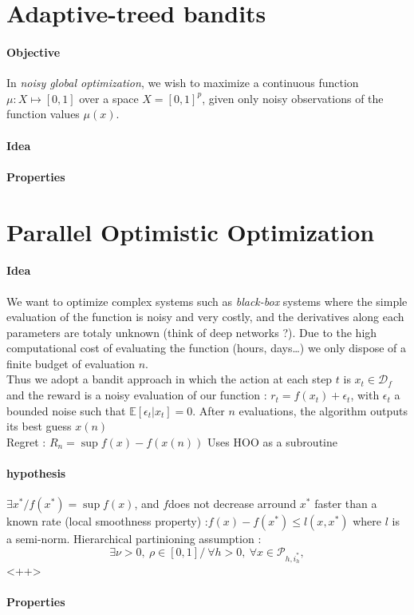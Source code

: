 \documentclass[a4paper,11pt,titlepage]{article}
\begin{document}
\section{Adaptive-treed bandits}
\paragraph{Objective}
In \textit{noisy global optimization}, we wish to maximize a continuous function $\mu :X \mapsto [0, 1]$ over a space $X = [0, 1]^p$, given only noisy observations of the function values $\mu(x)$.
\paragraph{Idea}
\paragraph{Properties}


\section{Parallel Optimistic Optimization}
\paragraph{Idea}
We want to optimize complex systems such as \textit{black-box} systems where the simple evaluation of the function is noisy and very costly, and the derivatives along each parameters are totaly unknown (think of deep networks ?). Due to the high computational cost of evaluating the function (hours, days\dots) we only dispose of a finite budget of evaluation $n$. \\
Thus we adopt a bandit approach in which the action at each step $t$ is $x_t \in \mathcal{D}_f$ and the reward is a noisy evaluation of our function : $r_t = f(x_t) +\epsilon_t$, with $\epsilon_t$ a bounded noise such that $\mathds{E}[\epsilon_t|x_t] = 0$. After $n$ evaluations, the algorithm outputs its best guess $x(n)$\\
Regret : $R_n = \sup f(x) - f(x(n))$
Uses HOO as a subroutine
\paragraph{hypothesis}
$\exists x^* / f(x^*) = \sup f(x)$, and $f$does not decrease arround $x^*$ faster than a known rate (local smoothness property) :$f(x)-f(x^*)\leq l(x,x^*)$ where $l$ is a semi-norm. Hierarchical partinioning assumption : 
\begin{equation*}
	\exists \nu >0, \ \rho \in [0,1]/ \ \forall h > 0, \ \forall x \in \mathscr{P}_{h,i^*_h}, 
\end{equation*}<++>
\paragraph{Properties}
\end{document}
